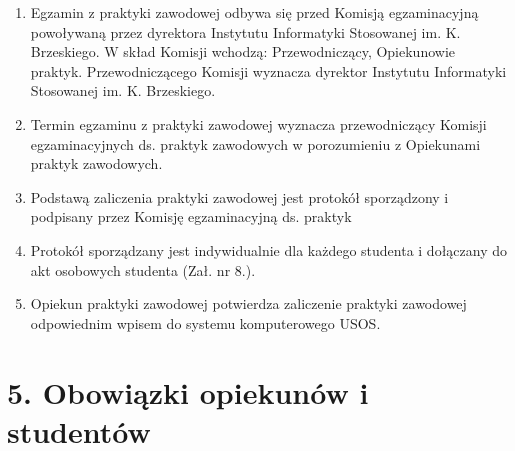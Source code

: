 \documentclass[12pt,a4paper]{article}
\begin{document}
\begin{enumerate}
    \item Egzamin z praktyki zawodowej odbywa się przed Komisją egzaminacyjną powoływaną przez dyrektora Instytutu Informatyki Stosowanej im. K. Brzeskiego. W skład Komisji wchodzą: Przewodniczący, Opiekunowie praktyk. Przewodniczącego Komisji wyznacza dyrektor Instytutu Informatyki Stosowanej im. K. Brzeskiego.
    \item Termin egzaminu z praktyki zawodowej wyznacza przewodniczący Komisji egzaminacyjnych ds. praktyk zawodowych w porozumieniu z Opiekunami praktyk zawodowych.
    \item Podstawą zaliczenia praktyki zawodowej jest protokół sporządzony i podpisany przez Komisję egzaminacyjną ds. praktyk
    \item Protokół sporządzany jest indywidualnie dla każdego studenta i dołączany do akt osobowych studenta (Zał. nr 8.).
    \item Opiekun praktyki zawodowej potwierdza zaliczenie praktyki zawodowej odpowiednim wpisem do systemu komputerowego USOS.
\end{enumerate}

\section*{5. Obowiązki opiekunów i studentów}
\end{document}
